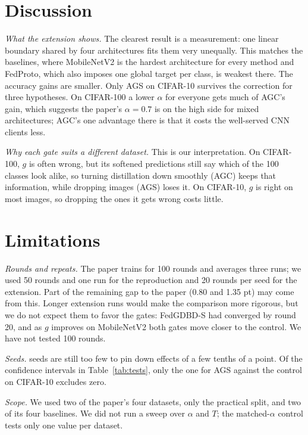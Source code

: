 \documentclass[conference]{IEEEtran}
\begin{document}
\section{Discussion}
\label{sec:discussion}

\textit{What the extension shows.} The clearest result is a measurement: one linear boundary shared by four architectures fits them very unequally. This matches the baselines, where MobileNetV2 is the hardest architecture for every method and FedProto, which also imposes one global target per class, is weakest there. The accuracy gains are smaller. Only AGS on CIFAR-10 survives the correction for three hypotheses. On CIFAR-100 a lower $\alpha$ for everyone gets much of AGC's gain, which suggests the paper's $\alpha=0.7$ is on the high side for mixed architectures; AGC's one advantage there is that it costs the well-served CNN clients less.

\textit{Why each gate suits a different dataset.} This is our interpretation. On CIFAR-100, $g$ is often wrong, but its softened predictions still say which of the 100 classes look alike, so turning distillation down smoothly (AGC) keeps that information, while dropping images (AGS) loses it. On CIFAR-10, $g$ is right on most images, so dropping the ones it gets wrong costs little.

\section{Limitations}
\label{sec:limits}

\textit{Rounds and repeats.} The paper trains for 100 rounds and averages three runs; we used 50 rounds and one run for the reproduction and 20 rounds per seed for the extension. Part of the remaining gap to the paper (0.80 and 1.35 pt) may come from this. Longer extension runs would make the comparison more rigorous, but we do not expect them to favor the gates: FedGDBD-S had converged by round 20, and as $g$ improves on MobileNetV2 both gates move closer to the control. We have not tested 100 rounds.

\textit{Seeds.} \NSeeds{} seeds are still too few to pin down effects of a few tenths of a point. Of the confidence intervals in Table~\ref{tab:tests}, only the one for AGS against the control on CIFAR-10 excludes zero.

\textit{Scope.} We used two of the paper's four datasets, only the practical split, and two of its four baselines. We did not run a sweep over $\alpha$ and $T$; the matched-$\alpha$ control tests only one value per dataset.
\end{document}
